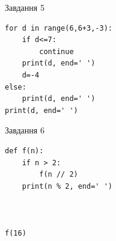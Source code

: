 \documentclass[12pt, ukrainian]{article}
\begin{document}
{\vspace{15mm}
\begin{minipage}[t]{9.7cm}                
{\begin{center}Завдання {5}\end{center}}
\begin{verbatim}
for d in range(6,6+3,-3):
    if d<=7:
        continue
    print(d, end=' ')
    d=-4
else:
    print(d, end=' ')
print(d, end=' ')
\end{verbatim}     
\end{minipage}
\vline \hspace{8mm}
\begin{minipage}[t]{8.0cm}                
{\begin{center}Завдання {6}\end{center}}
\begin{verbatim}
def f(n):
    if n > 2:
        f(n // 2)
    print(n % 2, end=' ')
    


f(16)
\end{verbatim}     
\end{minipage}

}
\newpage
\end{document}
